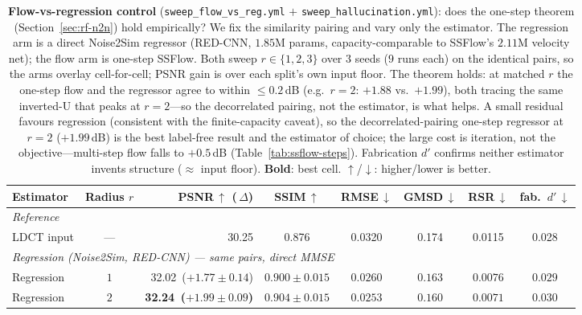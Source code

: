 \begin{table}[t]
  \centering
  \small
  \caption{\textbf{Flow-vs-regression control} (\texttt{sweep\_flow\_vs\_reg.yml}
           $+$ \texttt{sweep\_hallucination.yml}): does the one-step theorem
           (Section~\ref{sec:rf-n2n}) hold empirically?  We fix the similarity
           pairing and vary only the estimator.  The regression arm is a
           direct Noise2Sim regressor (RED-CNN, $1.85\mathrm{M}$ params,
           capacity-comparable to SSFlow's $2.11\mathrm{M}$ velocity net); the
           flow arm is one-step SSFlow.  Both sweep $r\in\{1,2,3\}$ over $3$
           seeds ($9$ runs each) on the identical pairs, so the arms overlay
           cell-for-cell; PSNR gain is over each split's own input floor.  The
           theorem holds: at matched $r$ the one-step flow and the regressor agree
           to within $\le0.2$\,dB (e.g.\ $r{=}2$: $+1.88$ vs.\ $+1.99$), both
           tracing the same inverted-U that peaks at $r{=}2$---so the decorrelated
           pairing, not the estimator, is what helps.  A small residual favours
           regression (consistent with the finite-capacity caveat), so the
           decorrelated-pairing one-step regressor at $r{=}2$
           ($+1.99$\,dB) is the best label-free result and the estimator of
           choice; the large cost is iteration, not the objective---multi-step
           flow falls to $+0.5$\,dB (Table~\ref{tab:ssflow-steps}).  Fabrication
           $d'$ confirms neither estimator invents structure ($\approx$ input
           floor).  \textbf{Bold}: best cell.  $\uparrow$/$\downarrow$: higher/lower
           is better.}
  \label{tab:flow-vs-reg}
  \begin{tabular}{lcrccccc}
    \toprule
    \textbf{Estimator} & \textbf{Radius $r$} &
    PSNR\,$\uparrow$ (\,$\Delta$) & SSIM\,$\uparrow$ & RMSE\,$\downarrow$ &
    GMSD\,$\downarrow$ & RSR\,$\downarrow$ & fab.\ $d'$\,$\downarrow$ \\
    \midrule
    \multicolumn{8}{l}{\emph{Reference}} \\
    \quad LDCT input & --- & 30.25 & 0.876 & 0.0320 & 0.174 & 0.0115 & 0.028 \\
    \midrule
    \multicolumn{8}{l}{\emph{Regression (Noise2Sim, RED-CNN) --- same pairs, direct MMSE}} \\
    Regression & $1$ & 32.02 \,($+1.77{\pm}0.14$) & $0.900{\pm}0.015$ & $0.0260$ & $0.163$ & $0.0076$ & $0.029$ \\
    Regression & $2$ & \textbf{32.24 \,($+1.99{\pm}0.09$)} & $0.904{\pm}0.015$ & $0.0253$ & $0.160$ & $0.0071$ & $0.030$ \\

\end{tabular}
\end{table}
